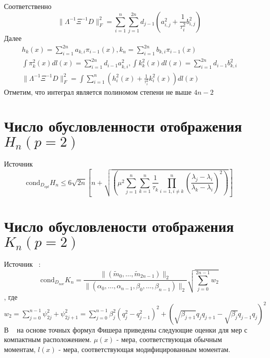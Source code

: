 Соответственно
\begin{equation}
\parallel \Lambda^{-1} \Xi^{-1}D \parallel^2_F=
\sum\limits_{i=1}^n
{
\sum\limits_{j=1}^{2n}
{
d_{j-1}
\left(
a_{i,j}^2+\displaystyle\frac{1}{\tau_i^2}b_{i,j}^2
\right)
}}
\end{equation}
Далее
\begin{eqnarray}
h_k(x)=\sum\limits_{i=1}^{2n}{a_{k,i}\pi_{i-1}(x)}, k_n=\sum\limits_{i=1}^{2n}{b_{k,i}\pi_{i-1}(x)} \nonumber \\
\int{\pi^2_k(x)dl(x)}=\sum\limits_{i=1}^{2n}{d_{i-1}a_{k,i}^2},\int{k_k^2(x)dl(x)}=\sum\limits_{i=1}^{2n}{d_{i-1}b_{k,i}^2} \nonumber \\
\parallel \Lambda^{-1} \Xi^{-1} D \parallel_F^2=\int {\sum\limits_{i=1}^{n}\left(
h_i^2(x)+\frac{1}{\tau_i^2}k_i^2(x)
\right)dl(x)} \nonumber
\end{eqnarray}
Отметим, что интеграл является полиномом степени не выше $4n-2$


\section{Число обусловленности отображения $H_n (p=2)$}

Источник ~\cite{Beckermann1} \\
\begin{equation}
\mbox{cond}_{D_{opt}}H_n\leq 6\sqrt{2n}\left[
n+\sqrt{
\left(
\mu^2\sum\limits_{j=1}^{n}\sum\limits_{k=1}^{n}
\frac{1}{\tau_k}\prod_{i=1,i\not=k}^{n}{
\left(
\frac{\lambda_j-\lambda_i}{\lambda_k-\lambda_i}\right)^2
}\right)}
\right]
\end{equation}


\section{Число обусловлености отображения $K_n (p=2)$  }

Источник ~\cite{Fischer1}:
\begin{equation}
\mbox{cond}_{D_{nor}}K_n=\frac{\parallel (\tilde{m}_0,\ldots,\tilde{m}_{2n-1}) \parallel_2}
{\parallel (\alpha_0,\ldots,\alpha_{n-1},\beta_{0},\ldots,\beta_{n-1})\parallel_2}
\sqrt{\sum\limits_{j=0}^{2n-1} {w_2}}
\end{equation}
, где $w_2=\sum\limits_{j=0}^{n-1}{\psi_{2j}^2+\psi_{2j+1}^2}=
\sum\limits_{j=0}^{n-1}{\beta_j^2(q_j^2-q_{j-1}^2)^2+
(\sqrt{\beta_{j+1}}q_jq_{j+1}-\sqrt{\beta_j}q_{j-1}q_j)^2}$
В ~\cite{Beckermann1} на основе точных формул Фишера приведены следующие оценки для мер
с компактным расположением. $\mu(x)$ - мера, соответствующая обычным моментам,
$l(x)$ - мера, соответствующая модифицированным моментам. \\


